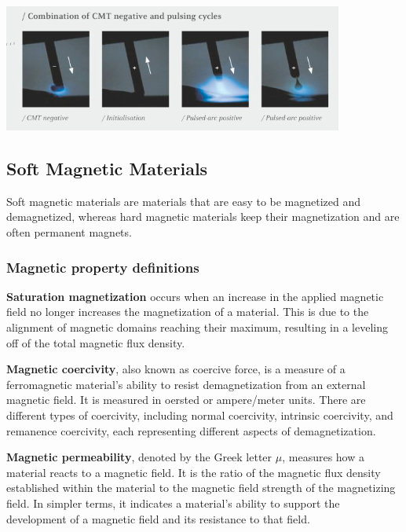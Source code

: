 \begin{minipage}{\linewidth}
    \centering
    \includegraphics[width=\linewidth]{images/CMT_illustration.PNG}
    \label{fig:CMT}
\end{minipage}


\subsection{Soft Magnetic Materials}

Soft magnetic materials are materials that are easy to be magnetized and demagnetized, whereas hard magnetic materials keep their magnetization and are often permanent magnets.

\subsubsection{Magnetic property definitions}

\textbf{Saturation magnetization} occurs when an increase in the applied magnetic field no longer increases the magnetization of a material. This is due to the alignment of magnetic domains reaching their maximum, resulting in a leveling off of the total magnetic flux density.

\textbf{Magnetic coercivity}, also known as coercive force, is a measure of a ferromagnetic material's ability to resist demagnetization from an external magnetic field. It is measured in oersted or ampere/meter units. There are different types of coercivity, including normal coercivity, intrinsic coercivity, and remanence coercivity, each representing different aspects of demagnetization.

\textbf{Magnetic permeability}, denoted by the Greek letter \(\mu\), measures how a material reacts to a magnetic field. It is the ratio of the magnetic flux density established within the material to the magnetic field strength of the magnetizing field. In simpler terms, it indicates a material's ability to support the development of a magnetic field and its resistance to that field.

